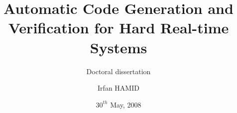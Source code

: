\documentclass{beamer}
\title[Automatic Code Gen. \&
  Verif. of HRT Systems.---Page \theframenumber/\inserttotalframenumber]{Automatic Code Generation and
  Verification for Hard Real-time Systems}
\author{Irfan HAMID}
\date{$30^{th}$ May, 2008}
\subtitle{Doctoral dissertation}
\institute[ENST]{\'Ecole Nationale Sup\'erieure des T\'el\'ecommunications}
\begin{document}
\begin{frame}
  \titlepage
\end{frame}



%





\end{document}
